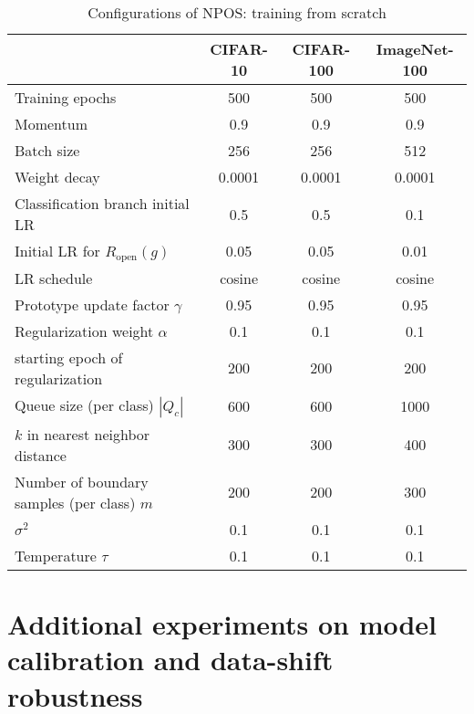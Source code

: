 \begin{table}[h]
  \centering
  \small
  \caption{Configurations of NPOS: training from scratch}
  \begin{tabular}{lccc}
    \toprule
     & CIFAR-10 & CIFAR-100 & ImageNet-100 \\
    \midrule
    Training epochs & 500   & 500   & 500 \\
    Momentum & 0.9   & 0.9   & 0.9 \\
    Batch size & 256   & 256   & 512 \\
    Weight decay & 0.0001 & 0.0001 & 0.0001 \\
    Classification branch initial LR & 0.5   & 0.5   & 0.1 \\
    Initial LR for $R_\text{open}(g)$ & 0.05  & 0.05  & 0.01 \\
    LR schedule & cosine & cosine & cosine \\
    Prototype update factor $\gamma$ & 0.95  & 0.95  & 0.95 \\
    Regularization weight $\alpha$ & 0.1   & 0.1   & 0.1 \\
    starting epoch of regularization & 200   & 200   & 200 \\
    Queue size (per class) $|Q_c|$ & 600   & 600   & 1000 \\
     $k$ in nearest neighbor distance & 300   & 300   & 400 \\
    Number of boundary samples (per class) $m$ & 200   & 200   & 300 \\
    $\sigma^2$  & 0.1   & 0.1   & 0.1 \\
    Temperature $\tau$ & 0.1   & 0.1   & 0.1 \\
    \bottomrule
    \end{tabular}\label{tab:train_from_scratch_hyper}\end{table}


\section{Additional experiments on model calibration and data-shift robustness}
